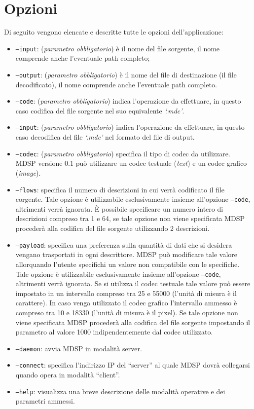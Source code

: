 \section{Opzioni}
\label{sec:opzioni}
Di seguito vengono elencate e descritte tutte le opzioni dell'applicazione:

\begin{itemize}
  \item \texttt{--input}: (\emph{parametro obbligatorio}) è il
  nome del file sorgente, il nome comprende anche l'eventuale path completo;
  \item \texttt{--output}: (\emph{parametro obbligatorio}) è il
  nome del file di destinazione (il file decodificato), il nome comprende anche l'eventuale path
  completo.
  \item \texttt{--code}: (\emph{parametro obbligatorio}) indica
  l'operazione da effettuare, in questo caso codifica del file sorgente nel suo equivalente
  \emph{`.mdc'}.
  \item \texttt{--input}: (\emph{parametro obbligatorio}) indica
  l'operazione da effettuare, in questo caso decodifica del file \emph{`.mdc'}
  nel formato del file di output.
  \item \texttt{--codec}: (\emph{parametro obbligatorio}) specifica il tipo di
  codec da utilizzare. MDSP versione 0.1 può utilizzare un codec testuale (\emph{text})
  e un codec grafico (\emph{image}).
  \item \texttt{--flows}: specifica il numero di descrizioni in cui verrà
  codificato il file corgente. Tale opzione è utilizzabile esclusivamente insieme all'opzione
  \texttt{--code}, altrimenti verrà ignorata. \`E possibile specificare un
  numero intero di descrizioni compreso tra 1 e 64, se tale opzione non viene
  specificata MDSP procederà alla codifica del file sorgente utilizzando 2
  descrizioni.
  \item \texttt{--payload}: specifica una preferenza sulla quantità di dati che
  si desidera vengano trasportati in ogni descrittore. MDSP può modificare tale
  valore allorquando l'utente specifichi un valore non compatibile con le
  specifiche. Tale opzione è utilizzabile esclusivamente insieme all'opzione
  \texttt{--code}, altrimenti verrà ignorata. Se si utilizza il codec testuale
  tale valore può essere impostato in un intervallo compreso tra 25 e 55000
  (l'unità di misura è il carattere). In caso venga utilizzato il codec grafico
  l'intervallo ammesso è compreso tra 10 e 18330 (l'unità di misura è il
  pixel). Se tale opzione non viene specificata MDSP procederà alla codifica
  del file sorgente impostando il parametro al valore 1000 indipendentemente dal codec utilizzato.
  \item \texttt{--daemon}: avvia MDSP in modalità server.
  \item \texttt{--connect}: specifica l'indirizzo IP del ``server'' al quale MDSP
  dovrà collegarsi quando opera in modalità ``client''.
  \item \texttt{--help}: visualizza una breve descrizione delle modalità
  operative e dei parametri ammessi.\\
\end{itemize}
